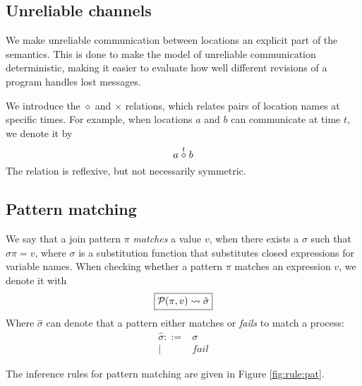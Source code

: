 \subsection{Unreliable channels}
We make unreliable communication between locations an explicit part of the
semantics. This is done to make the model of unreliable communication
deterministic, making it easier to evaluate how well different revisions of a
program handles lost messages.

We introduce the $\diamond$ and $\times$ relations, which relates pairs of
location names at specific times. For example, when locations $a$ and $b$ can
communicate at time $t$, we denote it by
\begin{equation*}
 a \linkUp{t} b
\end{equation*}
The relation is reflexive, but not necessarily symmetric.


\subsection{Pattern matching}
We say that a join pattern $\pi$ \emph{matches} a value $v$, when there exists
a $\sigma$ such that $\sigma \pi = v$, where $\sigma$ is a substitution
function that substitutes closed expressions for variable names.
When checking whether a pattern $\pi$ matches an expression $v$, we denote it
with
\begin{equation*}
  \boxed{\P(\pi,v) \leadsto \hat\sigma}
\end{equation*}
Where $\hat\sigma$ can denote that a pattern either matches or \emph{fails} to
match a process:
\begin{align*}
 \hat\sigma ::={}& \sigma \\
         |\quad{}& fail
\end{align*}

The inference rules for pattern matching are given in Figure \ref{fig:rule:pat}.

